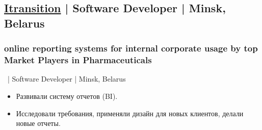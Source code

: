 \documentclass[a4paper]{article}
\begin{document}
\begin{minipage}[t]{0.6\textwidth}
    \subsection*{\href{http://www.itransition.com/}{Itransition} | Software Developer | Minsk, Belarus}
	\subsubsection*{online reporting systems for internal corporate usage by top Market Players in Pharmaceuticals}
    \ | Software Developer | Minsk, Belarus
    \begin{itemize}
      \item Развивали систему отчетов (BI). 
      \item Исследовали требования, применяли дизайн для новых клиентов, делали новые отчеты.
    \end{itemize}

  \end{minipage}
\end{document}
